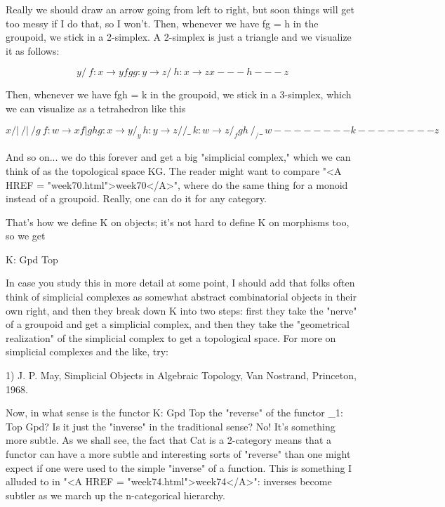 Really we should draw an arrow going from left to right, but soon
things will get too messy if I do that, so I won't.  Then, whenever we
have fg = h in the groupoid, we stick in a 2-simplex.  A 2-simplex is just
a triangle and we visualize it as follows: 


$$


      y
     / \                       f: x \to  y
    f   g                      g: y \to  z
   /     \                     h: x \to  z
  x---h---z

$$
    
Then, whenever we have fgh = k in the groupoid, we stick in a 3-simplex,
which we can visualize as a tetrahedron like this


$$


          x                      
         /|\                    
        / | \                  
       /  g  \                   f: w \to  x      
      f   |   gh                 g: x \to  y
     /   _y_   \                 h: y \to  z
    /   /   \_  \                k: w \to  z
   / _fg      h_ \        
  /_/           \_\      
 w--------k--------z

$$
    
And so on... we do this forever and get a big "simplicial complex,"
which we can think of as the topological space KG.  The reader might
want to compare "<A HREF = "week70.html">week70</A>", where
do the same thing for a monoid instead of a groupoid.  Really, one can
do it for any category.

That's how we define K on objects; it's not hard to define K on
morphisms too, so we get 

                      K: Gpd \to  Top

In case you study this in more detail at some point, I should add that
folks often think of simplicial complexes as somewhat abstract
combinatorial objects in their own right, and then they break down K 
into two steps: first they take the "nerve" of a groupoid and get a
simplicial complex, and then they take the "geometrical realization" of
the simplicial complex to get a topological space.  For more on
simplicial complexes and the like, try:

1) J. P. May, Simplicial Objects in Algebraic Topology, Van Nostrand,
Princeton, 1968.


Now, in what sense is the functor K: Gpd \to  Top the
"reverse" of the functor \Pi _{1}: Top \to  Gpd?  Is it
just the "inverse" in the traditional sense?  No!  It's
something more subtle.  As we shall see, the fact that Cat is a
2-category means that a functor can have a more subtle and interesting
sorts of "reverse" than one might expect if one were used to
the simple "inverse" of a function.  This is something I
alluded to in "<A HREF = "week74.html">week74</A>": inverses
become subtler as we march up the n-categorical hierarchy.

